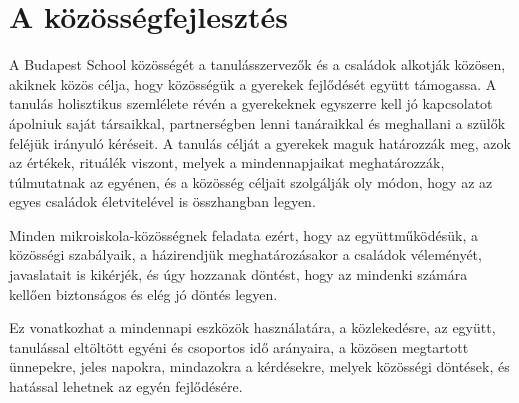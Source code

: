 \section{A közösségfejlesztés}
\label{sec:kozossegfejlesztes}
A Budapest School közösségét a tanulásszervezők és a családok alkotják közösen, akiknek közös célja, hogy közösségük a gyerekek fejlődését együtt támogassa. A tanulás holisztikus szemlélete révén a gyerekeknek egyszerre kell jó kapcsolatot ápolniuk saját társaikkal, partnerségben lenni tanáraikkal és meghallani a szülők feléjük irányuló kéréseit.  A tanulás célját a gyerekek maguk határozzák meg, azok az értékek, rituálék viszont, melyek a mindennapjaikat meghatározzák, túlmutatnak az egyénen, és a közösség céljait szolgálják oly módon, hogy az az egyes családok életvitelével is összhangban legyen.

Minden mikroiskola-közösségnek feladata ezért, hogy az együttműködésük, a közösségi szabályaik, a házirendjük meghatározásakor a családok véleményét, javaslatait is kikérjék, és úgy hozzanak döntést, hogy az mindenki számára kellően biztonságos és elég jó döntés legyen.

Ez vonatkozhat a mindennapi eszközök használatára, a közlekedésre, az együtt, tanulással eltöltött egyéni és csoportos idő arányaira, a közösen megtartott ünnepekre, jeles napokra,  mindazokra a kérdésekre, melyek közösségi döntések, és hatással lehetnek az egyén fejlődésére.
